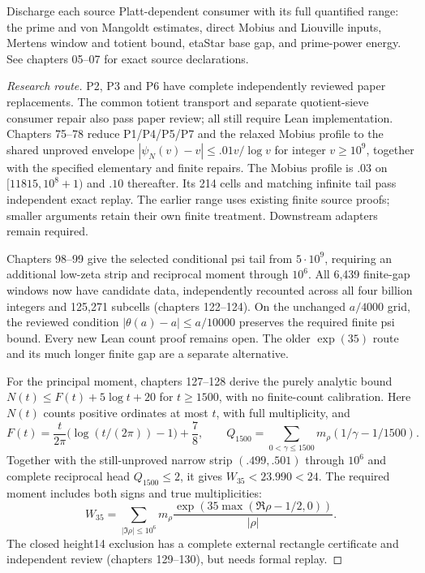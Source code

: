 \begin{theorem}\label{minorinputs}\notready
Discharge each source Platt-dependent consumer with its full quantified
range: the prime and von Mangoldt estimates, direct Mobius and Liouville
inputs, Mertens window and totient bound, etaStar base gap,
and prime-power energy. See chapters 05--07 for exact source declarations.
\end{theorem}
\begin{proof}[Research route]
P2, P3 and P6 have complete independently reviewed paper replacements.
The common totient transport and separate quotient-sieve consumer repair
also pass paper review; all still require Lean implementation.
Chapters 75--78 reduce P1/P4/P5/P7 and the relaxed Mobius profile to
the shared unproved envelope $|\psi_N(v)-v|\le .01v/\log v$ for integer
$v\ge10^9$, together with the specified elementary and finite repairs.
The Mobius profile is $.03$ on $[11815,10^8+1)$ and $.10$ thereafter.
Its 214 cells and matching infinite tail pass independent exact replay.
The earlier range uses existing finite source proofs; smaller arguments
retain their own finite treatment. Downstream adapters remain required.

Chapters 98--99 give the selected conditional psi tail from $5\cdot10^9$,
requiring an additional low-zeta strip and reciprocal moment through $10^6$.
All 6,439 finite-gap windows now have candidate data, independently recounted
across all four billion integers and 125,271 subcells (chapters 122--124).
On the unchanged $a/4000$ grid, the reviewed condition
$|\theta(a)-a|\le a/10000$ preserves the required finite psi bound.
Every new Lean count proof remains open. The older $\exp(35)$ route and its
much longer finite gap are a separate alternative.

For the principal moment, chapters 127--128 derive the purely analytic bound
$N(t)\le F(t)+5\log t+20$ for $t\ge1500$, with no finite-count calibration.
Here $N(t)$ counts positive ordinates at most $t$, with full multiplicity, and
\[F(t)=\frac{t}{2\pi}\bigl(\log(t/(2\pi))-1\bigr)+\frac78,\qquad
 Q_{1500}=\sum_{0<\gamma\le1500}m_\rho(1/\gamma-1/1500).\]
Together with the still-unproved narrow strip $(.499,.501)$ through $10^6$
and complete reciprocal head $Q_{1500}\le2$, it gives $W_{35}<23.990<24$.
The required moment includes both signs and true multiplicities:
\[W_{35}=\sum_{|\Im\rho|\le10^6}m_\rho
 \frac{\exp(35\max(\Re\rho-1/2,0))}{|\rho|}.\]
The closed height14 exclusion has a complete external rectangle certificate
and independent review (chapters 129--130), but needs formal replay.


\end{proof}
